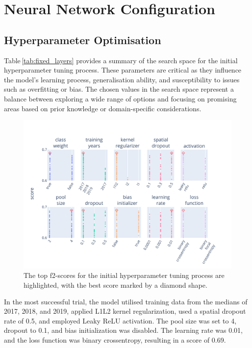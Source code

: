 \chapter{Neural Network Configuration}
\label{chapter:hyper}
\section{Hyperparameter Optimisation}

\centering



Table\,\ref{tab:fixed_layers} provides a summary of the search space for the initial hyperparameter tuning process. These parameters are critical as they influence the model's learning process, generalisation ability, and susceptibility to issues such as overfitting or bias. The chosen values in the search space represent a balance between exploring a wide range of options and focusing on promising areas based on prior knowledge or domain-specific considerations.

\begin{figure}[ht]
    \centering
    \includegraphics[width=0.9\linewidth, trim={10pt 10pt 40pt 40pt}, clip]{figures/figures_tuner/fixed_layers.pdf}
    \caption{The top f2-scores for the initial hyperparameter tuning process are highlighted, with the best score marked by a diamond shape.}
    \label{fig:fixed_layers}
\end{figure}

In the most successful trial, the model utilised training data from the medians of 2017, 2018, and 2019, applied L1L2 kernel regularization, used a spatial dropout rate of 0.5, and employed Leaky ReLU activation. The pool size was set to 4, dropout to 0.1, and bias initialization was disabled. The learning rate was 0.01, and the loss function was binary crossentropy, resulting in a score of 0.69.

